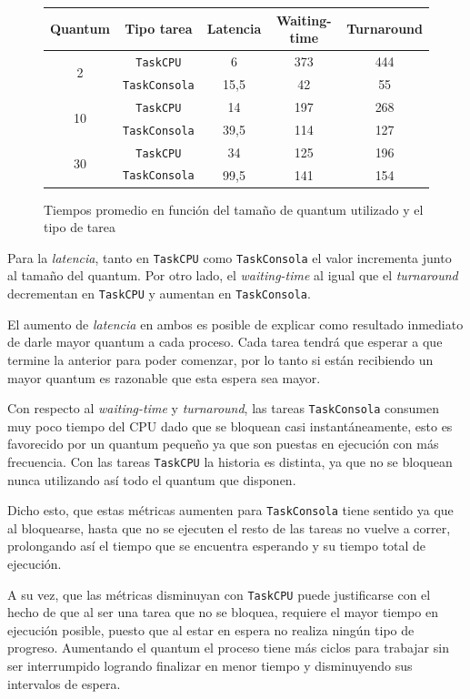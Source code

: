 \begin{figure}[H]
	\begin{center}
		\begin{tabular}{|c|c|c|c|c|}
			\hline
			\textbf{Quantum} & \textbf{Tipo tarea} & \textbf{Latencia} & \textbf{Waiting-time} & \textbf{Turnaround} \\ \hline
			\multirow{2}{*}{2} & \texttt{TaskCPU} & 6 & 373 & 444 \\ \cline{2-5}
			& \texttt{TaskConsola} & 15,5 & 42 & 55 \\ \hline \hline
			\multirow{2}{*}{10} & \texttt{TaskCPU} & 14 & 197 & 268 \\ \cline{2-5}
			& \texttt{TaskConsola} & 39,5 & 114 & 127 \\ \hline \hline
			\multirow{2}{*}{30} & \texttt{TaskCPU} & 34 & 125 & 196 \\ \cline{2-5}
			& \texttt{TaskConsola} & 99,5 & 141 & 154 \\ \hline
		\end{tabular}
		\caption{Tiempos promedio en función del tamaño de quantum utilizado y
		el tipo de tarea}
	\end{center}
\end{figure}

Para la \emph{latencia}, tanto en \texttt{TaskCPU} como \texttt{TaskConsola} el
valor incrementa junto al tamaño del quantum. Por otro lado, el
\emph{waiting-time} al igual que el \emph{turnaround} decrementan en
\texttt{TaskCPU} y aumentan en \texttt{TaskConsola}.

El aumento de \emph{latencia} en ambos es posible de explicar como resultado
inmediato de darle mayor quantum a cada proceso. Cada tarea tendrá que esperar
a que termine la anterior para poder comenzar, por lo tanto si están
recibiendo un mayor quantum es razonable que esta espera sea mayor.

Con respecto al \emph{waiting-time} y \emph{turnaround}, las tareas
\texttt{TaskConsola} consumen muy poco tiempo del CPU dado que se bloquean casi
instantáneamente, esto es favorecido por un quantum pequeño ya que son puestas
en ejecución con más frecuencia. Con las tareas \texttt{TaskCPU} la historia es
distinta, ya que no se bloquean nunca utilizando así todo el quantum que
disponen.

Dicho esto, que estas métricas aumenten para \texttt{TaskConsola}
tiene sentido ya que al bloquearse, hasta que no se ejecuten el resto de las tareas no
vuelve a correr, prolongando así el tiempo que se encuentra esperando y su tiempo
total de ejecución.

A su vez, que las métricas disminuyan con \texttt{TaskCPU} puede justificarse
con el hecho de que al ser una tarea que no se bloquea, requiere el mayor tiempo
en ejecución posible, puesto que al estar en espera no realiza ningún tipo de
progreso. Aumentando el quantum el proceso tiene más ciclos para trabajar sin
ser interrumpido logrando finalizar en menor tiempo y disminuyendo sus
intervalos de espera.
